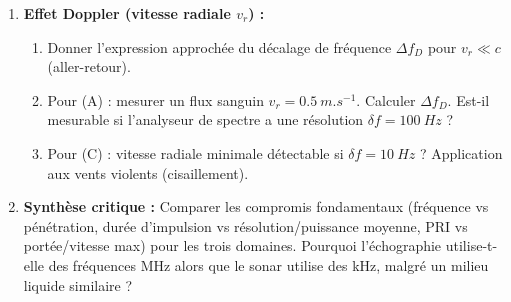 \documentclass[11pt]{article}
\begin{document}
\begin{exercice}
\begin{enumerate}
\begin{enumerate}
    \end{enumerate}
    \item \textbf{Effet Doppler (vitesse radiale $v_r$) :} 
    \begin{enumerate}
        \item Donner l'expression approchée du décalage de fréquence $\Delta f_D$ pour $v_r \ll c$ (aller-retour). 
        \item Pour (A) : mesurer un flux sanguin $v_r = \SI{0,5}{m.s^{-1}}$. Calculer $\Delta f_D$. Est-il mesurable si l'analyseur de spectre a une résolution $\delta f = \SI{100}{Hz}$ ?
        \item Pour (C) : vitesse radiale minimale détectable si $\delta f = \SI{10}{Hz}$ ? Application aux vents violents (cisaillement).
    \end{enumerate}
    \item \textbf{Synthèse critique :} Comparer les compromis fondamentaux (fréquence vs pénétration, durée d'impulsion vs résolution/puissance moyenne, PRI vs portée/vitesse max) pour les trois domaines. Pourquoi l'échographie utilise-t-elle des fréquences MHz alors que le sonar utilise des kHz, malgré un milieu liquide similaire ?
\end{enumerate}
\end{exercice}
\end{document}
